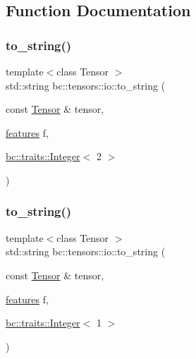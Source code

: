 \subsection{Function Documentation}
\mbox{\label{namespacebc_1_1tensors_1_1io_a6f4605b831f96dcdf9017221d2c65454}} 
\subsubsection{\texorpdfstring{to\+\_\+string()}{to\_string()}\hspace{0.1cm}{\footnotesize\ttfamily [1/4]}}
{\footnotesize\ttfamily template$<$class Tensor $>$ \\
std\+::string bc\+::tensors\+::io\+::to\+\_\+string (\begin{DoxyParamCaption}\item[{const \hyperlink{namespacebc_a659391e47ab612be3ba6c18cf9c89159}{Tensor} \&}]{tensor,  }\item[{\hyperlink{structbc_1_1tensors_1_1io_1_1features}{features}}]{f,  }\item[{\hyperlink{structbc_1_1traits_1_1Integer}{bc\+::traits\+::\+Integer}$<$ 2 $>$}]{ }\end{DoxyParamCaption})}

\mbox{\label{namespacebc_1_1tensors_1_1io_aae7dd280a6d62f82dc6d01292c33a0bc}} 
\subsubsection{\texorpdfstring{to\+\_\+string()}{to\_string()}\hspace{0.1cm}{\footnotesize\ttfamily [2/4]}}
{\footnotesize\ttfamily template$<$class Tensor $>$ \\
std\+::string bc\+::tensors\+::io\+::to\+\_\+string (\begin{DoxyParamCaption}\item[{const \hyperlink{namespacebc_a659391e47ab612be3ba6c18cf9c89159}{Tensor} \&}]{tensor,  }\item[{\hyperlink{structbc_1_1tensors_1_1io_1_1features}{features}}]{f,  }\item[{\hyperlink{structbc_1_1traits_1_1Integer}{bc\+::traits\+::\+Integer}$<$ 1 $>$}]{ }\end{DoxyParamCaption})}

